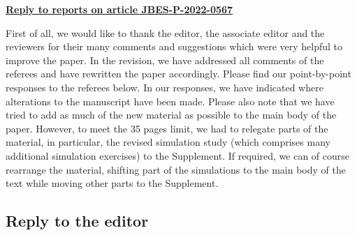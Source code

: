 \documentclass[a4paper,12pt]{article}
\begin{document}
\begin{center}
\underline{\Large\textbf{{Reply to reports on article JBES-P-2022-0567}}}\end{center}
\vspace{10pt}


First of all, we would like to thank the editor, the associate editor and the reviewers for their many comments and suggestions which were very helpful to improve the paper. In the revision, we have addressed all comments of the referees and have rewritten the paper accordingly.
Please find our point-by-point responses to the referees below. In our responses, we have indicated where alterations to the manuscript have been made. Please also note that we have tried to add as much of the new material as possible to the main body of the paper. However, to meet the 35 pages limit, we had to relegate parts of the material, in particular, the revised simulation study (which comprises many additional simulation exercises) to the Supplement. If required, we can of course rearrange the material, shifting part of the simulations to the main body of the text while moving other parts to the Supplement. 



\subsection*{Reply to the editor}
\end{document}
